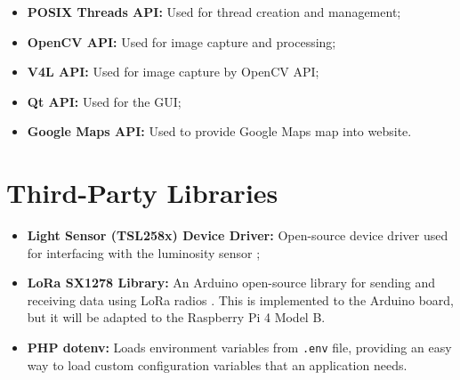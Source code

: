 \begin{itemize}
	\item \textbf{POSIX Threads API:} Used for thread creation and management;
	\item \textbf{OpenCV API:} Used for image capture and processing;
	\item \textbf{V4L API:} Used for image capture by OpenCV API;
	\item \textbf{Qt API:} Used for the GUI;
	\item \textbf{Google Maps API:} Used to provide Google Maps map into website.
\end{itemize}

\clearpage
\section{Third-Party Libraries}

\begin{itemize}
	\item \textbf{Light Sensor (TSL258x) Device Driver:} Open-source device driver used for interfacing with the luminosity sensor \cite{code_tsl};
	\item \textbf{LoRa SX1278 Library:} An Arduino open-source library for sending and receiving data using LoRa radios \cite{sx1278_lib}. This is implemented to the Arduino board, but it will be adapted to the Raspberry Pi 4 Model B.
	\item \textbf{PHP dotenv:} Loads environment variables from \verb|.env| file, providing an easy way to load custom configuration variables that an application needs. \cite{phpdotenv}
\end{itemize}
